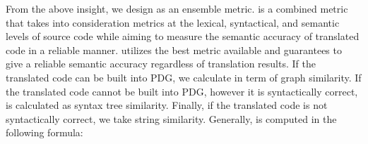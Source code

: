 


From the above insight, we design {\model} as an ensemble %
metric. {\model} is a combined metric that takes into consideration
metrics at the lexical, syntactical, and semantic levels of source
code while aiming to measure the semantic accuracy of translated code
in a reliable manner. {\model} utilizes the best metric available and
guarantees to give a reliable semantic accuracy regardless of
translation results. If the translated code can be built into PDG, we
calculate {\model} in term of graph similarity. If the translated code
cannot be built into PDG, however it is syntactically correct, {\model}
is calculated as syntax tree similarity. Finally, if the translated code
is not syntactically correct, we take string similarity. Generally, {\model}
is computed in the following formula:

